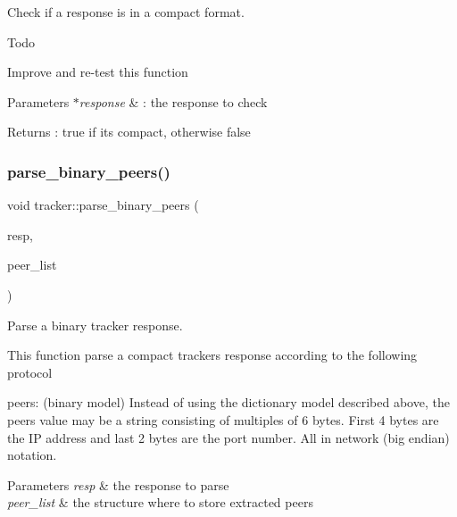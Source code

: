 Check if a response is in a compact format. 

\begin{DoxyRefDesc}{Todo}
\item[\hyperlink{todo__todo000006}{Todo}]Improve and re-\/test this function\end{DoxyRefDesc}



\begin{DoxyParams}{Parameters}
{\em $\ast$response} & \+: the response to check \\
\hline
\end{DoxyParams}
\begin{DoxyReturn}{Returns}
\+: true if it\textquotesingle{}s compact, otherwise false 
\end{DoxyReturn}
\mbox{\label{namespacetracker_a237de4c8b0282af2d59cd5d0b7bfd1fd}} 
\subsubsection{\texorpdfstring{parse\+\_\+binary\+\_\+peers()}{parse\_binary\_peers()}}
{\footnotesize\ttfamily void tracker\+::parse\+\_\+binary\+\_\+peers (\begin{DoxyParamCaption}\item[{const string \&}]{resp,  }\item[{\hyperlink{namespacepwp_ad07fa6df116b205302ad5ec172277184}{pwp\+::\+Peer\+List}}]{peer\+\_\+list }\end{DoxyParamCaption})}



Parse a binary tracker response. 

This function parse a compact tracker\textquotesingle{}s response according to the following protocol

peers\+: (binary model) Instead of using the dictionary model described above, the peers value may be a string consisting of multiples of 6 bytes. First 4 bytes are the IP address and last 2 bytes are the port number. All in network (big endian) notation.


\begin{DoxyParams}{Parameters}
{\em resp} & the response to parse \\
\hline
{\em peer\+\_\+list} & the structure where to store extracted peers \\
\hline
\end{DoxyParams}
\mbox{\label{namespacetracker_a38d52cf6dd86f2a26a719e285097c805}} 
